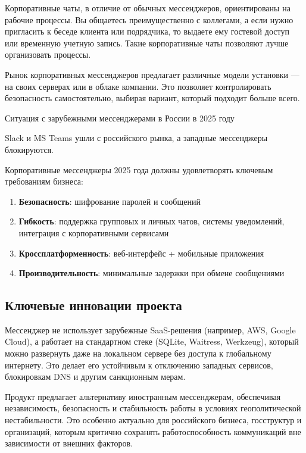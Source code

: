 Корпоративные чаты, в отличие от обычных мессенджеров, ориентированы на рабочие процессы. Вы общаетесь преимущественно с коллегами, а если нужно пригласить к беседе клиента или подрядчика, то выдаете ему гостевой доступ или временную учетную запись. Такие корпоративные чаты позволяют лучше организовать процессы.

Рынок корпоративных мессенджеров предлагает различные модели установки — на своих серверах или в облаке компании. Это позволяет контролировать безопасность самостоятельно, выбирая вариант, который подходит больше всего.

Ситуация с зарубежными мессенджерами в России в 2025 году

Slack и MS Teams ушли с российского рынка, а западные мессенджеры блокируются.

Корпоративные мессенджеры 2025 года должны удовлетворять ключевым требованиям бизнеса:

\begin{enumerate}
	\item \textbf{Безопасность}: шифрование паролей и сообщений
	\item \textbf{Гибкость}: поддержка групповых и личных чатов, системы уведомлений, интеграция с корпоративными сервисами
	\item \textbf{Кроссплатформенность}: веб-интерфейс + мобильные приложения
	\item \textbf{Производительность}: минимальные задержки при обмене сообщениями
\end{enumerate}

\subsection{Ключевые инновации проекта}

Мессенджер не использует зарубежные SaaS-решения (например, AWS, Google Cloud), а работает на стандартном стеке (SQLite, Waitress, Werkzeug), который можно развернуть даже на локальном сервере без доступа к глобальному интернету. Это делает его устойчивым к отключению западных сервисов, блокировкам DNS и другим санкционным мерам.

Продукт предлагает альтернативу иностранным мессенджерам, обеспечивая независимость, безопасность и стабильность работы в условиях геополитической нестабильности. Это особенно актуально для российского бизнеса, госструктур и организаций, которым критично сохранять работоспособность коммуникаций вне зависимости от внешних факторов.
		


